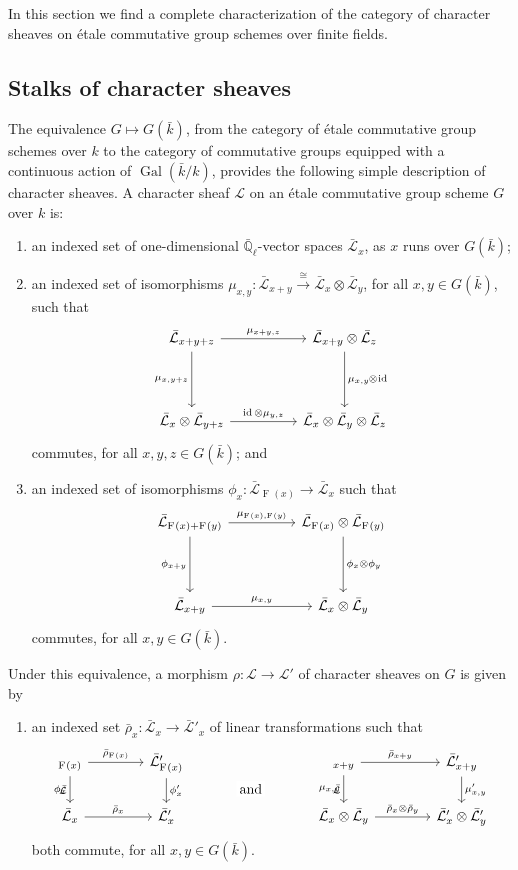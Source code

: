 \documentclass[10pt]{amsart}
\makeatletter
\theoremstyle{plain}
\theoremstyle{definition}
\theoremstyle{remark}
\newcommand{\EE}{\mathbb{\bar Q}_\ell}
\newcommand{\bFq}{\bar{k}}
\newcommand{\Fq}{k}
\DeclareMathOperator{\Gal}{Gal}
\newcommand{\Frob}[1]{\operatorname{F}_{#1}}
\DeclareMathOperator{\id}{id}
\newcommand{\iso}{{\ \cong\ }}
\newcommand{\cs}[1]{{\mathcal{#1}}}
\newcommand{\gcs}[1]{{\mathcal{\bar #1}}}
\newcommand{\labitem}[2]{
\def\@itemlabel{\textbf{#1}}
\item
\def\@currentlabel{#1}\label{#2}}
\newcommand{\brho}{{\bar\rho}}
\newcommand{\tight}[3]{\hspace{-#1pt}{#2}\hspace{-#3pt}}
\makeatother
\begin{document}
In this section we find a complete characterization of the category of character sheaves on \'etale commutative group schemes over finite fields.

\subsection{Stalks of character sheaves}\label{ssec:stalks}

The equivalence $G \mapsto G(\bFq)$,
from the category of \'etale commutative group schemes over $\Fq$ to the category of commutative groups equipped
with a continuous action of $\Gal(\bFq/\Fq)$,
provides the following simple description of character sheaves.
%
A character sheaf $\cs{L}$ on an \'etale commutative group scheme $G$ over $\Fq$ is:
\begin{enumerate}
 \labitem{(cs.1)}{cs.1} an indexed set of one-dimensional
  $\EE$-vector spaces $\gcs{L}_x$, as $x$ runs over
  $G(\bFq)$;

 \labitem{(cs.2)}{cs.2} an indexed set of isomorphisms
  $\mu_{x,y} : \gcs{L}_{x+y} \xrightarrow{\iso} \gcs{L}_{x} \otimes\gcs{L}_{y}$,
  for all $x,y \in G(\bFq)$, such that
  \[
   \begin{tikzcd}[row sep=40]
    \gcs{L}_{x+y+z} \arrow{rr}{\mu_{x+y,z}} \arrow[swap]{d}{\mu_{x,y+z}}
    && \gcs{L}_{x+y}\otimes\gcs{L}_{z} \dar{\mu_{x,y} \tight{0.5}{\otimes}{1} \id} \\
    \gcs{L}_{x} \otimes\gcs{L}_{y+z} \arrow{rr}{\id \otimes\mu_{y,z}}
    && \gcs{L}_{x} \otimes\gcs{L}_{y} \otimes\gcs{L}_{z}
   \end{tikzcd}
  \]
  commutes, for all $x,y,z\in G(\bFq)$; and
 \labitem{(cs.3)}{cs.3} an indexed set of isomorphisms $\phi_{x} : \gcs{L}_{\Frob{}(x)} \to \gcs{L}_x$
  such that
  \[
   \begin{tikzcd}[row sep=40]
    \gcs{L}_{\Frob{}(x)+\Frob{}(y)} \arrow[swap]{d}{\phi_{x+y}} \arrow{rr}{\mu_{\Frob{}(x),\Frob{}(y)}}
    && \gcs{L}_{\Frob{}(x)}\otimes\gcs{L}_{\Frob{}(y)} \dar{\phi_x \tight{0}{\otimes}{0} \phi_y} \\
    \gcs{L}_{x+y} \arrow{rr}{\mu_{x,y}}
    && \gcs{L}_x \otimes\gcs{L}_y
   \end{tikzcd}
  \]
  commutes, for all $x,y\in G(\bFq)$.
\end{enumerate}
Under this equivalence, a morphism $\rho : \cs{L} \to \cs{L'}$ of character sheaves on $G$ is given by
\begin{enumerate}
 \labitem{(cs.4)}{cs.4} an indexed set $\brho_x : \gcs{L}_x \to \gcs{L'}_x$
  of linear transformations such that
  \[
   \begin{tikzcd}[column sep=40]
    \arrow[swap]{d}{\phi_x} \gcs{L}_{\Frob{}(x)} \rar{\brho_{\Frob{}(x)}} & \gcs{L'}_{\Frob{}(x)} \dar{\phi_x'}
    &\arrow[draw=none]{d}[pos=.4,description]{\text{\normalsize{and}}}
    & \arrow[swap]{d}{\mu_{x,y}} \gcs{L}_{x+y} \rar{\brho_{x+y}} & \gcs{L'}_{x+y} \dar{\mu'_{x,y}} \\
    \gcs{L}_x \rar{\brho_x} & \gcs{L'}_x
    & {} & \gcs{L}_x\otimes\gcs{L}_y \rar{\brho_x\otimes\brho_y} & \gcs{L'}_x \otimes\gcs{L'}_y
   \end{tikzcd}
  \]
  both commute, for all $x, y \in G(\bFq)$.
\end{enumerate}
\end{document}
